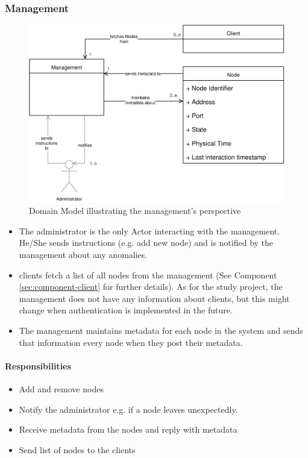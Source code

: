 \subsubsection{Management}

\begin{figure}[h]
    \centering
    \includegraphics[width=0.75\linewidth]{resources/management_domain_model}
    \caption[Management Domain Model]{Domain Model illustrating the \gls{management}'s perspective}
\end{figure}
\begin{itemize}
    \item The \gls{administrator} is the only Actor interacting with the \gls{management}. He/She sends instructions (e.g. add new \gls{node}) and is notified by the \gls{management} about any anomalies.
    \item \glspl{client} fetch a list of all \glspl{node} from the \gls{management} (See Component \ref{sec:component-client}  for further details). As for the study project, the \gls{management} does not have any information about \glspl{client}, but this might change when authentication is implemented in the future.
    \item The \gls{management} maintains \gls{metadata} for each \gls{node} in the \gls{system} and sends that information every \gls{node} when they post their \gls{metadata}.
\end{itemize}

\paragraph{Responsibilities}
\begin{itemize}
    \item Add and remove \glspl{node}
    \item Notify the \gls{administrator} e.g. if a \gls{node} leaves unexpectedly.
    \item Receive \gls{metadata} from the \glspl{node} and reply with \gls{metadata}
    \item Send list of \glspl{node} to the \glspl{client}
\end{itemize}

